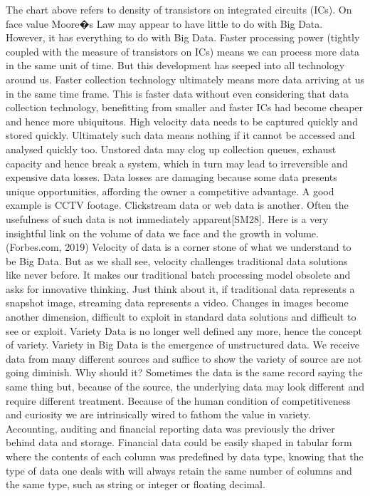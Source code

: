 The chart above refers to density of transistors on integrated circuits (ICs).  On face value Moore�s Law may appear to have little to do with Big Data.  However, it has everything to do with Big Data.  Faster processing power (tightly coupled with the measure of transistors on ICs) means we can process more data in the same unit of time.  But this development has seeped into all technology around us.  Faster collection technology ultimately means more data arriving at us in the same time frame.  This is faster data without even considering that data collection technology, benefitting from smaller and faster ICs had become cheaper and hence more ubiquitous.  High velocity data needs to be captured quickly and stored quickly.  Ultimately such data means nothing if it cannot be accessed and analysed quickly too. Unstored data may clog up collection queues, exhaust capacity and hence break a system, which in turn may lead to irreversible and expensive data losses. Data losses are damaging because some data presents unique opportunities, affording the owner a competitive advantage. A good example is CCTV footage. Clickstream data or web data is another.  Often the usefulness of such data is not immediately apparent[SM28].   
Here is a very insightful link on the volume of data we face and the growth in volume.
(Forbes.com, 2019)
Velocity of data is a corner stone of what we understand to be Big Data.  But as we shall see, velocity challenges traditional data solutions like never before.  It makes our traditional batch processing model obsolete and asks for innovative thinking.  Just think about it, if traditional data represents a snapshot image, streaming data represents a video.  Changes in images become another dimension, difficult to exploit in standard data solutions and difficult to see or exploit.
Variety
Data is no longer well defined any more, hence the concept of variety.  Variety in Big Data is the emergence of unstructured data.  We receive data from many different sources and suffice to show the variety of source are not going diminish.  Why should it? Sometimes the data is the same record saying the same thing but, because of the source, the underlying data may look different and require different treatment.  Because of the human condition of competitiveness and curiosity we are intrinsically wired to fathom the value in variety.  Accounting, auditing and financial reporting data was previously the driver behind data and storage.  Financial data could be easily shaped in tabular form where the contents of each column was predefined by data type, knowing that the type of data one deals with will always retain the same number of columns and the same type, such as string or integer or floating decimal.  
